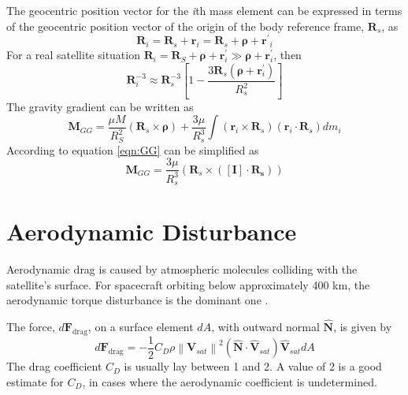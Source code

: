 The geocentric position vector for the \textit{i}th mass element can be expressed in terms of the geocentric position vector of the origin of the body reference frame, $\mathbf{R}_s$, as
\begin{equation}
    \mathbf{R}_i = \mathbf{R}_s + \mathbf{r}_i = \mathbf{R}_s + \boldsymbol{\rho}+\mathbf{r^{\prime}}_i
\end{equation}
For a real satellite situation $\mathbf{R}_{i}=\mathbf{R}_{S}+\boldsymbol{\rho}+\mathbf{r}_{i}^{\prime} \gg \boldsymbol{\rho}+\mathbf{r}_{i}^{\prime}$, then
\begin{equation}
\mathbf{R}_{i}^{-3} \approx \mathbf{R}_{s}^{-3}\left[1-\frac{3 \boldsymbol{R}_{s}\left(\boldsymbol{\rho}+\boldsymbol{r}_{i}^{\prime}\right)}{R_{s}^{2}}\right]    
\end{equation}
The gravity gradient can be written as
\begin{equation} \label{eqn:GG}
    \mathbf{M}_{G G}=\frac{\mu M}{R_{S}^{2}}\left(\boldsymbol{R}_{s} \times \boldsymbol{\rho}\right)+\frac{3 \mu}{R_{s}^{3}} \int\left(\mathbf{r}{}_{i} \times {\boldsymbol{R}_s}\right)\left(\mathbf{r}_{i} \cdot {\boldsymbol{R}_{{s}}}\right) d m_{i}
\end{equation}
According to \cite{wertz2012spacecraft} equation \ref{eqn:GG} can be simplified as
\begin{equation}
\mathbf{M}_{G G}=\dfrac{3 \mu}{R_{s}^{3}}\left( \mathbf{R}_s \times([\mathbf{I}] \cdot \mathbf{R_{s}}) \right)
\end{equation}

\section{Aerodynamic Disturbance}
Aerodynamic drag is caused by atmospheric molecules colliding with the satellite's surface. For spacecraft orbiting below approximately 400 km, the aerodynamic torque disturbance is the dominant one \cite{wertz2012spacecraft}.

The force, $d\mathbf{F}_{\text{drag}}$, on a surface element $dA$, with outward normal $\hat{\mathbf{N}}$, is given by
\begin{equation}\label{eqn:Td}
d \mathbf{F}_{\text{drag}}=-\frac{1}{2} C_{D} \rho \left\|\mathbf{V}_{s a t}\right\|^{2}\left(\hat{\mathbf{N}} \cdot \hat{\mathbf{V}}_{s a t}\right) \hat{\mathbf{V}}_{s a t} d A
\end{equation}
The drag coefficient $C_D$ is usually lay between 1 and 2. A value of 2 is a good estimate for $C_D$, in cases where the aerodynamic coefficient is undetermined. 

